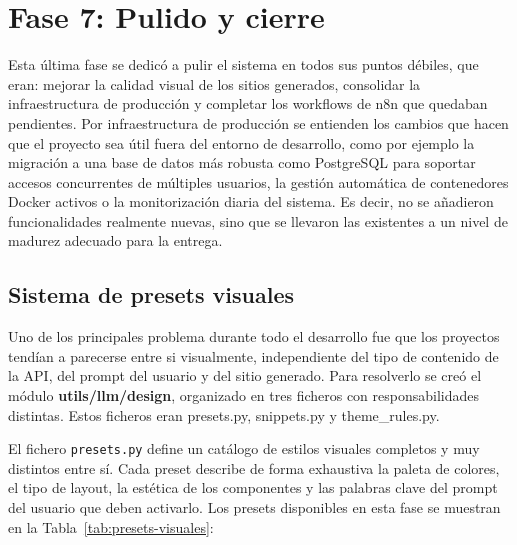\section{Fase 7: Pulido y cierre}
\label{sec:pulido-cierre}

Esta última fase se dedicó a pulir el sistema en todos sus puntos débiles, que eran: mejorar la calidad visual de los sitios generados, consolidar la infraestructura de producción y completar los workflows de n8n que quedaban pendientes. Por infraestructura de producción se entienden los cambios que hacen que el proyecto sea útil fuera del entorno de desarrollo, como por ejemplo la migración a una base de datos más robusta como PostgreSQL para soportar accesos concurrentes de múltiples usuarios, la gestión automática de contenedores Docker activos o la monitorización diaria del sistema. Es decir, no se añadieron funcionalidades realmente nuevas, sino que se llevaron las existentes a un nivel de madurez adecuado para la entrega.


\subsection{Sistema de presets visuales}
\label{subsec:sistema-presets-visuales}

Uno de los principales problema durante todo el desarrollo fue que los proyectos tendían a parecerse entre si visualmente, independiente del tipo de contenido de la API, del prompt del usuario y del sitio generado. Para resolverlo se creó el módulo \textbf{utils/llm/design}, organizado en tres ficheros con responsabilidades distintas. Estos ficheros eran presets.py, snippets.py y theme\_rules.py.

El fichero \texttt{presets.py} define un catálogo de estilos visuales completos y muy distintos entre sí. Cada preset describe de forma exhaustiva la paleta de colores, el tipo de layout, la estética de los componentes y las palabras clave del prompt del usuario que deben activarlo. Los presets disponibles en esta fase se muestran en la Tabla~\ref{tab:presets-visuales}:

